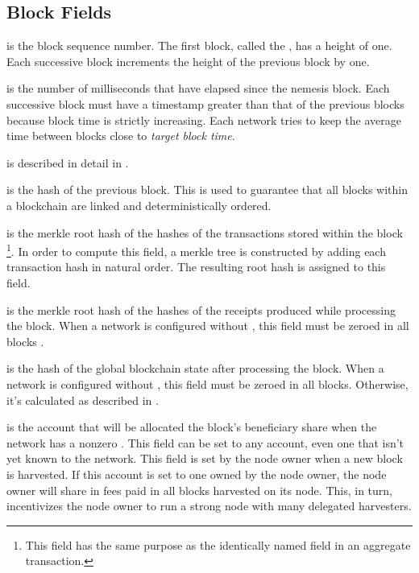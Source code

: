 \subsection{Block Fields}

 is the block sequence number.
The first block, called the , has a height of one.
Each successive block increments the height of the previous block by one.

 is the number of milliseconds that have elapsed since the nemesis block.
Each successive block must have a timestamp greater than that of the previous blocks because block time is strictly increasing.
Each network tries to keep the average time between blocks close to \textit{target block time}.

 is described in detail in .

 is the hash of the previous block.
This is used to guarantee that all blocks within a blockchain are linked and deterministically ordered.

 is the merkle root hash of the hashes of the transactions stored within the block
\footnote{This field has the same purpose as the identically named field in an aggregate transaction.}.
In order to compute this field, a merkle tree is constructed by adding each transaction hash in natural order.
The resulting root hash is assigned to this field.

 is the merkle root hash of the hashes of the receipts produced while processing the block.
When a network is configured without , this field must be zeroed in all blocks .

 is the hash of the global blockchain state after processing the block.
When a network is configured without , this field must be zeroed in all blocks.
Otherwise, it's calculated as described in .

 is the account that will be allocated the block's beneficiary share when the network has a nonzero .
This field can be set to any account, even one that isn't yet known to the network.
This field is set by the node owner when a new block is harvested.
If this account is set to one owned by the node owner, the node owner will share in fees paid in all blocks harvested on its node.
This, in turn, incentivizes the node owner to run a strong node with many delegated harvesters.


